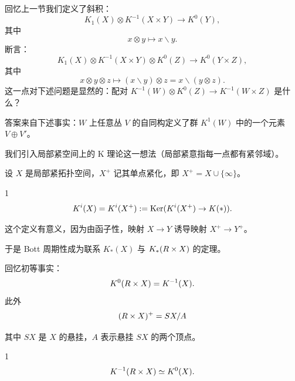 回忆上一节我们定义了斜积：
\[ K_1(X)\otimes K^{-1}(X\times Y)\to K^0(Y), \]
其中
\[ x\otimes y\mapsto x\backslash y. \]
断言：
\[ K_1(X)\otimes K^{-1}(X\times Y)\otimes K^0(Z)\to K^0(Y\times Z), \]
其中
\[ x\otimes y\otimes z\mapsto (x\backslash y)\otimes z=x\backslash(y\otimes z). \]
这一点对下述问题是显然的：配对 $K^{-1}(W)\otimes K^0(Z)\to K^{-1}(W\times Z)$ 是什么？

答案来自下述事实：$W$ 上任意丛 $V$ 的自同构定义了群 $K^1(W)$ 中的一个元素 $V\oplus V'$。


我们引入局部紧空间上的 K 理论这一想法（局部紧意指每一点都有紧邻域）。

设 $X$ 是局部紧拓扑空间，$X^+$ 记其单点紧化，即 $X^+=X\cup\{\infty\}$。

\begin{defn}{1}
\[ K^i(X)= K^i(X^+):=\operatorname{Ker}(K^i(X^+)\to K(*)). \]
\end{defn}

这个定义有意义，因为由函子性，映射 $X\to Y$ 诱导映射 $X^+\to Y^+$。

于是 Bott 周期性成为联系 $K_*(X)$ 与 $K_*(R\times X)$ 的定理。

回忆初等事实：
\[ K^0(R\times X)=K^{-1}(X). \]
此外
\[ (R\times X)^+=SX/A \]

其中 $SX$ 是 $X$ 的悬挂，$A$ 表示悬挂 $SX$ 的两个顶点。

\begin{thm}{1}
\[ K^{-1}(R\times X)\simeq K^0(X). \]
\end{thm}

